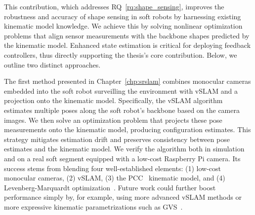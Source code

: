 
This contribution, which addresses \gls{RQ}~\ref{rq:shape_sensing}, improves the robustness and accuracy of shape sensing in soft robots by harnessing existing kinematic model knowledge.
We achieve this by solving nonlinear optimization problems that align sensor measurements with the backbone shapes predicted by the kinematic model.
Enhanced state estimation is critical for deploying feedback controllers, thus directly supporting the thesis’s core contribution.
Below, we outline two distinct approaches.

The first method presented in Chapter~\ref{chp:srslam} combines monocular cameras embedded into the soft robot surveilling the environment with \gls{vSLAM} and a projection onto the kinematic model.
Specifically, the \gls{vSLAM} algorithm estimates multiple poses along the soft robot’s backbone based on the camera images. We then solve an optimization problem that projects these pose measurements onto the kinematic model, producing configuration estimates. This strategy mitigates estimation drift and preserves consistency between pose estimates and the kinematic model. We verify the algorithm both in simulation and on a real soft segment equipped with a low-cost Raspberry Pi camera. Its success stems from blending four well-established elements: (1) low-cost monocular cameras, (2) \gls{vSLAM}, (3) the \gls{PCC}~\citep{webster2010design} kinematic model, and (4) Levenberg-Marquardt optimization~\citep{levenberg1944method, marquardt1963algorithm}. Future work could further boost performance simply by, for example, using more advanced \gls{vSLAM} methods or more expressive kinematic parametrizations such as \gls{GVS}~\citep{renda2020geometric}.


